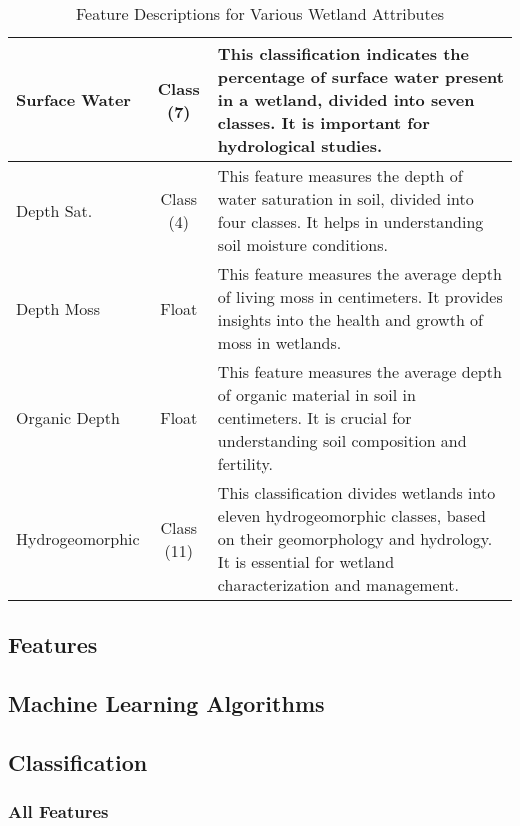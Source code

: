 \documentclass[12pt,letterpaper]{article}
\begin{document}
\begin{table}[h]
\begin{tabular}{|m{3cm}|c|m{11cm}|}
        \hline
        Surface Water & Class (7) & This classification indicates the percentage of surface water present in a wetland, divided into seven classes. It is important for hydrological studies. \\
        \hline
        Depth Sat. & Class (4) & This feature measures the depth of water saturation in soil, divided into four classes. It helps in understanding soil moisture conditions. \\
        \hline
        Depth Moss & Float & This feature measures the average depth of living moss in centimeters. It provides insights into the health and growth of moss in wetlands. \\
        \hline
        Organic Depth & Float & This feature measures the average depth of organic material in soil in centimeters. It is crucial for understanding soil composition and fertility. \\
        \hline
        Hydrogeomorphic & Class (11) & This classification divides wetlands into eleven hydrogeomorphic classes, based on their geomorphology and hydrology. It is essential for wetland characterization and management. \\
        \hline
    \end{tabular}
    \caption{Feature Descriptions for Various Wetland Attributes}
    \label{tab:data_xtra_features}
\end{table}
\clearpage
\subsection{Features}


\clearpage
\subsection{Machine Learning Algorithms}\label{sec:algorithms}


\subsection{Classification}\label{sec:class_annex}
\subsubsection{All Features}

\clearpage

\clearpage

\clearpage
\end{document}
